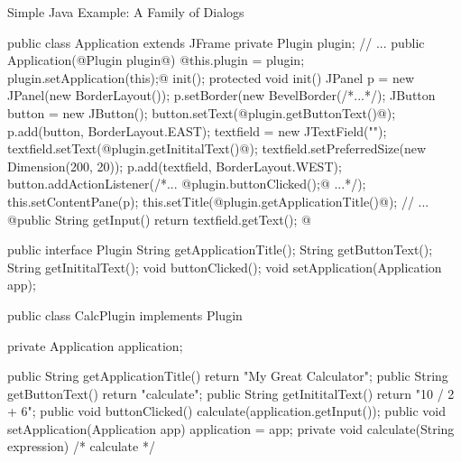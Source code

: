 \begin{frame}[fragile]{Simple Java Example: A Family of Dialogs}
	\begin{mycolumns}[columns=2,widths={50,50}]
\tiny
\begin{codetight}{}
public class Application extends JFrame {
	private Plugin plugin;
	// ...
	public Application(@Plugin plugin@) {
		@this.plugin = plugin;
		plugin.setApplication(this);@
		init();
	}
	protected void init() {
		JPanel p = new JPanel(new BorderLayout());
		p.setBorder(new BevelBorder(/*...*/);
		JButton button = new JButton();
		button.setText(@plugin.getButtonText()@);
		p.add(button, BorderLayout.EAST);
		textfield = new JTextField("");
		textfield.setText(@plugin.getInititalText()@);
		textfield.setPreferredSize(new Dimension(200, 20));
		p.add(textfield, BorderLayout.WEST);		
		button.addActionListener(/*... @plugin.buttonClicked();@ ...*/);
		this.setContentPane(p);		
		this.setTitle(@plugin.getApplicationTitle()@);
		// ...
	}
	@public String getInput() {
		return textfield.getText();
	}@
}
\end{codetight}
		\mynextcolumn
{\tiny
\begin{codetight}{}
public interface Plugin {
	String getApplicationTitle();
	String getButtonText();
	String getInititalText();
	void buttonClicked();
	void setApplication(Application app);
}
\end{codetight}
\begin{codetight}{}
public class CalcPlugin implements Plugin {
	private Application application;

	public String getApplicationTitle() {
		return "My Great Calculator";
	}
	public String getButtonText() {
		return "calculate";
	}
	public String getInititalText() {
		return "10 / 2 + 6";
	}
	public void buttonClicked() {
		calculate(application.getInput());
	}
	public void setApplication(Application app) {
		application = app;
	}
	private void calculate(String expression) {
		/* calculate */
	}
}
\end{codetight}
}
	\end{mycolumns}
\end{frame}

